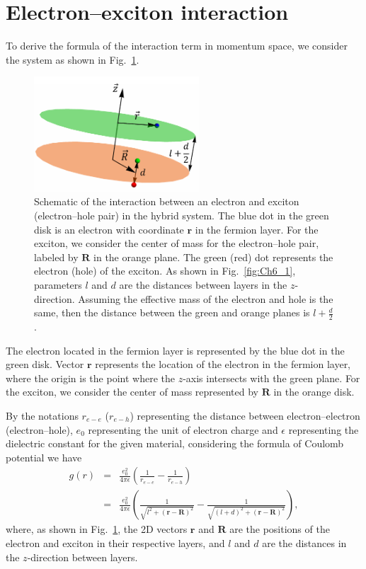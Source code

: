 \section{Electron--exciton interaction}
To derive the formula of the interaction term in momentum space, we consider the system as shown in Fig.~\ref{fig:CH6_gk}.
%
\begin{figure}
    \centering
    \includegraphics[width=0.55\textwidth]{Fig/Ch6/elec-exc.pdf}
    \caption[Electron and exciton interaction in the hybrid system]{Schematic of the interaction between an electron and exciton (electron--hole pair) in the hybrid system. The blue dot in the green disk is an electron with coordinate $\mathbf{r}$ in the fermion layer. For the exciton, we consider the center of mass for the electron--hole pair, labeled by $\mathbf{R}$ in the orange plane. The green (red) dot represents the electron (hole) of the exciton. As shown in Fig.~\ref{fig:Ch6_1}, parameters $l$ and $d$ are the distances between layers in the $z$-direction. Assuming the effective mass of the electron and hole is the same, then the distance between the green and orange planes is $l+\frac{d}{2}$.  }
    \label{fig:CH6_gk}
\end{figure}
%
The electron located in the fermion layer is represented by the blue dot in the green disk.
Vector $\mathbf{r}$ represents the location of the electron in the fermion layer, where the origin is the point where the $z$-axis intersects with the green plane.
For the exciton, we consider the center of mass represented by $\mathbf{R}$ in the orange disk.

By the notations $r_{e-e}$ ($r_{e-h}$) representing the distance between electron--electron (electron--hole), $e_0$ representing the unit of electron charge and $\epsilon$ representing the dielectric constant for the given material, considering the formula of Coulomb potential we have
%
\begin{eqnarray}
g\left(r\right) &=& \frac{e_0^2}{4\pi\epsilon}\left( \frac{1}{r_{e-e}}-\frac{1}{r_{e-h}}\right) \\ \nonumber
&=& \frac{e_0^2}{4\pi \epsilon} \left( \frac{1}{\sqrt{l^2+\left( \mathbf{r} - \mathbf{R} \right)^2}} - \frac{1}{\sqrt{ \left(l+d\right)^2+\left( \mathbf{r} -\mathbf{R} \right)^2 }}\right), \label{eq:CH6_gk_real_space}
\end{eqnarray}
where, as shown in Fig.~\ref{fig:CH6_gk}, the 2D vectors $\mathbf{r}$ and $\mathbf{R}$ are the positions of the electron and exciton in their respective layers, and $l$ and $d$ are the distances in the $z$-direction between layers.

